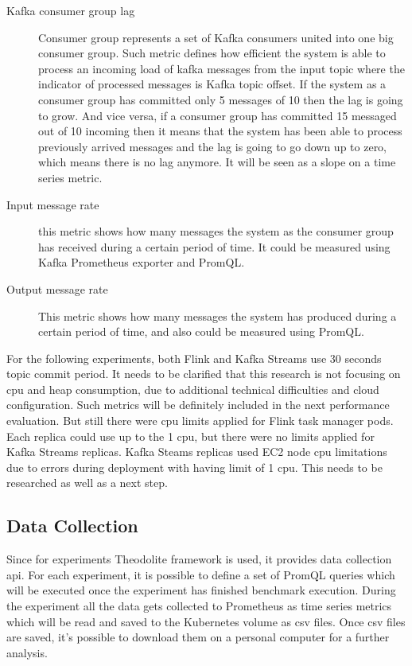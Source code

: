 \begin{description}
    \item[Kafka consumer group lag] Consumer group represents a set of Kafka consumers
    united into one big consumer group.
    Such metric defines how efficient the system is able to process an incoming load of
    kafka messages from the input topic where the indicator of processed messages is Kafka topic
    offset.
    If the system as a consumer group has committed only 5 messages of 10 then the lag is going to grow.
    And vice versa, if a consumer group has committed 15 messaged out of 10 incoming then it means that
    the system has been able to process previously arrived messages and the lag is going to go down up to
    zero, which means there is no lag anymore.
    It will be seen as a slope on a time series metric.
    \item[Input message rate]
    this metric shows how many messages the system as the consumer group has received during a certain period of time.
    It could be measured using Kafka Prometheus exporter and PromQL.
    \item[Output message rate]
    This metric shows how many messages the system has produced during a certain period of time, and
    also could be measured using PromQL.
\end{description}

For the following experiments, both Flink and Kafka Streams use 30 seconds
topic commit period.
It needs to be clarified that this research is not focusing on cpu and heap consumption,
due to additional technical difficulties and cloud configuration.
Such metrics will be definitely included in the next performance evaluation.
But still there were cpu limits applied for Flink task manager pods.
Each replica could use up to the 1 cpu, but there were no limits applied
for Kafka Streams replicas.
Kafka Steams replicas used EC2 node cpu limitations due
to errors during deployment with having limit of 1 cpu.
This needs to be researched as well as a next step.


\subsection{Data Collection}\label{subsec:data-collection}
Since for experiments Theodolite framework is used, it provides data collection api.
For each experiment, it is possible to define a set of PromQL queries which
will be executed once the experiment has finished benchmark execution.
During the experiment all the data gets collected to Prometheus as time
series metrics which will be read and saved to the Kubernetes volume as
csv files.
Once csv files are saved, it's possible to download them on a personal
computer for a further analysis.
